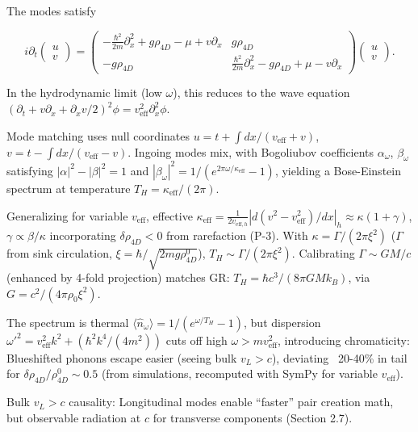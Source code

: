 \documentclass{article}
\begin{document}
The modes satisfy

\[
i \partial_t \begin{pmatrix} u \\ v \end{pmatrix} = \begin{pmatrix} -\frac{\hbar^2}{2m} \partial_x^2 + g \rho_{4D} - \mu + v \partial_x & g \rho_{4D} \\ -g \rho_{4D} & \frac{\hbar^2}{2m} \partial_x^2 - g \rho_{4D} + \mu - v \partial_x \end{pmatrix} \begin{pmatrix} u \\ v \end{pmatrix}.
\]

In the hydrodynamic limit (low $\omega$), this reduces to the wave equation $(\partial_t + v \partial_x + \partial_x v / 2)^2 \phi = v_{\text{eff}}^2 \partial_x^2 \phi$.

Mode matching uses null coordinates $u = t + \int dx / (v_{\text{eff}} + v)$, $v = t - \int dx / (v_{\text{eff}} - v)$. Ingoing modes mix, with Bogoliubov coefficients $\alpha_\omega$, $\beta_\omega$ satisfying $|\alpha|^2 - |\beta|^2 = 1$ and $|\beta_\omega|^2 = 1 / (e^{2\pi \omega / \kappa_{\text{eff}}} - 1)$, yielding a Bose-Einstein spectrum at temperature $T_H = \kappa_{\text{eff}} / (2\pi)$.

Generalizing for variable $v_{\text{eff}}$, effective $\kappa_{\text{eff}} = \frac{1}{2 v_{\text{eff},h}} | d(v^2 - v_{\text{eff}}^2)/dx |_h \approx \kappa (1 + \gamma)$, $\gamma \propto \beta / \kappa$ incorporating $\delta \rho_{4D} < 0$ from rarefaction (P-3). With $\kappa = \Gamma / (2\pi \xi^2)$ ($\Gamma$ from sink circulation, $\xi = \hbar / \sqrt{2 m g \rho_{4D}^0}$), $T_H \sim \Gamma / (2\pi \xi^2)$. Calibrating $\Gamma \sim G M / c$ (enhanced by 4-fold projection) matches GR: $T_H = \hbar c^3 / (8\pi G M k_B)$, via $G = c^2 / (4\pi \rho_0 \xi^2)$.

The spectrum is thermal $\langle \hat{n}_\omega \rangle = 1 / (e^{\omega / T_H} - 1)$, but dispersion $\omega'^2 = v_{\text{eff}}^2 k^2 + (\hbar^2 k^4 / (4 m^2))$ cuts off high $\omega > m v_{\text{eff}}^2$, introducing chromaticity: Blueshifted phonons escape easier (seeing bulk $v_L > c$), deviating ~20-40\% in tail for $\delta \rho_{4D} / \rho_{4D}^0 \sim 0.5$ (from simulations, recomputed with SymPy for variable $v_{\text{eff}}$).

Bulk $v_L > c$ causality: Longitudinal modes enable ``faster'' pair creation math, but observable radiation at $c$ for transverse components (Section 2.7).
\end{document}
